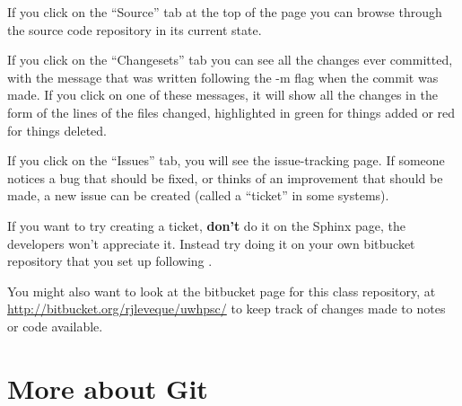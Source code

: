 \documentclass[letterpaper,10pt,english]{sphinxmanual}
\begin{document}
If you click on the ``Source'' tab at the top of the page you can browse
through the source code repository in its current state.

If you click on the ``Changesets'' tab you can see all the changes ever
committed, with the message that was written following the -m flag when the
commit was made.  If you click on one of these messages, it will show all
the changes in the form of the lines of the files changed, highlighted in
green for things added or red for things deleted.

If you click on the ``Issues'' tab, you will see the issue-tracking page.  If
someone notices a bug that should be fixed, or thinks of an improvement that
should be made, a new issue can be created (called a ``ticket'' in some systems).

If you want to try creating a ticket, \textbf{don't} do it on the Sphinx page,
the developers won't appreciate it.  Instead try doing it on your own
bitbucket repository that you set up following .

You might also want to look at the bitbucket page for this class repository,
at \url{http://bitbucket.org/rjleveque/uwhpsc/} to keep track
of changes made to notes or code available.


\section{More about Git}
\label{git_more:more-about-git}\label{git_more::doc}\label{git_more:git-more}
\end{document}

